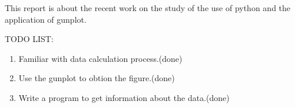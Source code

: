 \par
This report is about the recent work on the study of the use of python and the application of gunplot.


TODO LIST\@:
\begin{enumerate}
    \item Familiar with data calculation process.(done)
    \item Use the gunplot to obtion the figure.(done)
    \item Write a program to get information about the data.(done)
\end{enumerate}
